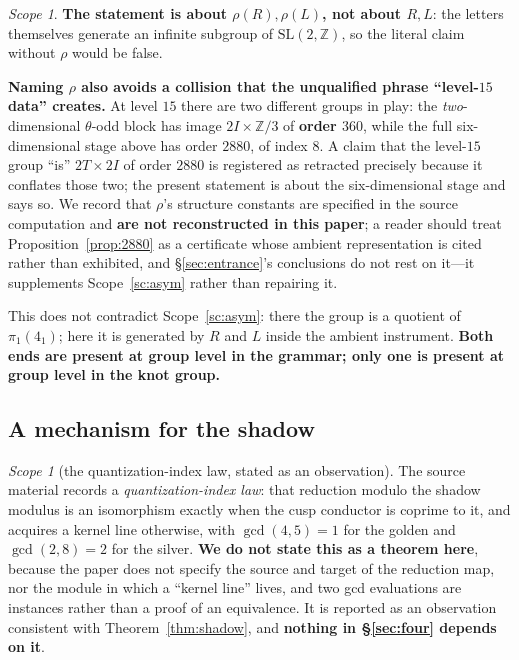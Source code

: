 \documentclass[11pt,reqno]{amsart}
\theoremstyle{plain}
\theoremstyle{definition}
\theoremstyle{remark}
\newtheorem{scope}[theorem]{Scope}
\newcommand{\Z}{\mathbb{Z}}
\newcommand{\SL}{\mathrm{SL}}
\begin{document}
\begin{scope}\label{sc:2880}
\textbf{The statement is about $\rho(R),\rho(L)$, not about $R,L$}: the letters
themselves generate an infinite subgroup of $\SL(2,\Z)$, so the literal claim without
$\rho$ would be false.

\textbf{Naming $\rho$ also avoids a collision that the unqualified phrase ``level-$15$
data'' creates.} At level $15$ there are two different groups in play: the
\emph{two}-dimensional $\theta$-odd block has image $2I\times\Z/3$ of \textbf{order
$360$}, while the full six-dimensional stage above has order $2880$, of index $8$. A
claim that the level-$15$ group ``is'' $2T\times2I$ of order $2880$ is registered as
retracted precisely because it conflates those two; the present statement is about the
six-dimensional stage and says so. We record that $\rho$'s structure constants are
specified in the source computation and \textbf{are not reconstructed in this paper}; a
reader should treat
Proposition~\ref{prop:2880} as a certificate whose ambient representation is cited
rather than exhibited, and \S\ref{sec:entrance}'s conclusions do not rest on it---it
supplements Scope~\ref{sc:asym} rather than repairing it.
\end{scope}

This does not contradict Scope~\ref{sc:asym}: there the group is a quotient of
$\pi_1(4_1)$; here it is generated by $R$ and $L$ inside the ambient instrument.
\textbf{Both ends are present at group level in the grammar; only one is present at
group level in the knot group.}

\subsection{A mechanism for the shadow}

\begin{scope}[the quantization-index law, stated as an observation]\label{obs:qil}
The source material records a \emph{quantization-index law}: that reduction modulo the
shadow modulus is an isomorphism exactly when the cusp conductor is coprime to it, and
acquires a kernel line otherwise, with $\gcd(4,5)=1$ for the golden and $\gcd(2,8)=2$
for the silver. \textbf{We do not state this as a theorem here}, because the paper does
not specify the source and target of the reduction map, nor the module in which a
``kernel line'' lives, and two gcd evaluations are instances rather than a proof of an
equivalence. It is reported as an observation consistent with
Theorem~\ref{thm:shadow}, and \textbf{nothing in \S\ref{sec:four} depends on it}.
\end{scope}
\end{document}
